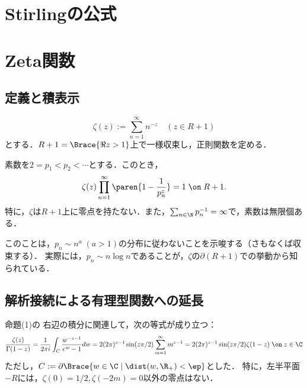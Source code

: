 \documentclass[uplatex, dvipdfmx]{jsreport}
\begin{document}
\section{Stirlingの公式}

\section{Zeta関数}

\subsection{定義と積表示}

\begin{proposition}
    \[\zeta(z):=\sum^\infty_{n=1}n^{-z}\quad(z\in R+1)\]
    とする．$R+1=\Brace{\Re z>1}$上で一様収束し，正則関数を定める．
\end{proposition}

\begin{theorem}[Euler積表示]
    素数を$2=p_1<p_2<\cdots$とする．このとき，
    \[\zeta(z)\prod^\infty_{n=1}\paren{1-\frac{1}{p_n^z}}=1\;\on\;R+1.\]
    特に，$\zeta$は$R+1$上に零点を持たない．また，$\sum_{n\in\N}p^{-1}_n=\infty$で，素数は無限個ある．
\end{theorem}
\begin{remarks}
    このことは，$p_n\sim n^a\;(a>1)$の分布に従わないことを示唆する（さもなくば収束する）．
    実際には，$p_n\sim n\log n$であることが，$\zeta$の$\partial(R+1)$での挙動から知られている．
\end{remarks}

\subsection{解析接続による有理型関数への延長}

\begin{lemma}
    命題(1)の
    右辺の積分に関連して，次の等式が成り立つ：
    \[\frac{\zeta(z)}{\Gamma(1-z)}=\frac{1}{2\pi i}\int_C\frac{w^{-z-1}}{e^{w}-1}dw=2(2\pi)^{z-1}\sin(z\pi/2)\sum_{m=1}^\infty m^{z-1}=2(2\pi)^{z-1}\sin(z\pi/2)\zeta(1-z)\;\on\; z\in\C\]
    ただし，$C:=\partial\Brace{w\in\C\mid\dist(w,\R_+)<\ep}$とした．
    特に，左半平面$-R$には，$\zeta(0)=1/2,\zeta(-2m)=0$以外の零点はない．
\end{lemma}
\end{document}
